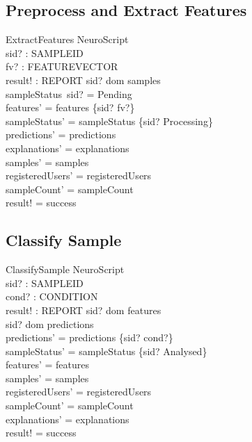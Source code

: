 \documentclass[12pt,a4paper]{article}
\begin{document}
\subsection{Preprocess and Extract Features}

\begin{schema}{ExtractFeatures}
\Delta NeuroScript \\
sid? : SAMPLEID \\
fv? : FEATUREVECTOR \\
result! : REPORT
\where
sid? \in dom samples \\
sampleStatus~sid? = Pending \\
features' = features \cup \{sid? \mapsto fv?\} \\
sampleStatus' = sampleStatus \oplus \{sid? \mapsto Processing\} \\
predictions' = predictions \\
explanations' = explanations \\
samples' = samples \\
registeredUsers' = registeredUsers \\
sampleCount' = sampleCount \\
result! = success
\end{schema}

\subsection{Classify Sample}

\begin{schema}{ClassifySample}
\Delta NeuroScript \\
sid? : SAMPLEID \\
cond? : CONDITION \\
result! : REPORT
\where
sid? \in dom features \\
sid? \notin dom predictions \\
predictions' = predictions \cup \{sid? \mapsto cond?\} \\
sampleStatus' = sampleStatus \oplus \{sid? \mapsto Analysed\} \\
features' = features \\
samples' = samples \\
registeredUsers' = registeredUsers \\
sampleCount' = sampleCount \\
explanations' = explanations \\
result! = success
\end{schema}
\end{document}
